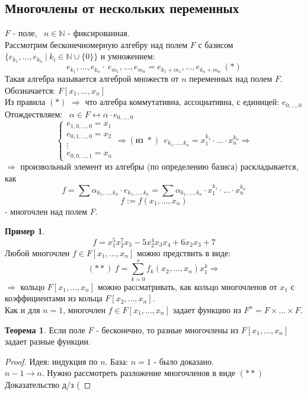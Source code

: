 \documentclass[a4paper, 12pt]{article}
\newcommand{\N}{\mathbb N}
\theoremstyle{definition}
\newtheorem*{theorem}{Теорема}
\newtheorem*{example1}{Пример}
\begin{document}
  \subsection{Многочлены от нескольких переменных}
  $F$ - поле, \ $n \in \N$ - фиксированная. \\
  Рассмотрим бесконечномерную алгебру над полем $F$ с базисом \\ $\{e_{k_1},...,e_{k_n} \ | \ k_i \in \N \cup \{0\} \} $ и умножением:
  $$e_{k_1},...,e_{k_n} \cdot \ e_{m_1},...,e_{m_n} = e_{k_1 + m_1},...,e_{k_n + m_n} \ (*)$$
  Такая алгебра называется алгеброй множеств от $n$ переменных над полем $F$. \\
  Обозначается: $F[x_1,...,x_n]$\\
  Из правила $(*)$ $\Longrightarrow $ что алгебра коммутативна, ассоциативна, с единицей: $e_{0,...,0}$\\
  Отождествляем: \ $\alpha \in F \longleftrightarrow \alpha \cdot e_{0,...,0}$
  $$\begin{cases}
    e_{1,0,...,0} = x_1\\
    e_{0,1,...,0} = x_2\\
    \vdots\\
    e_{0,0,...,1} = x_n
  \end{cases} \Longrightarrow (\text{из } *) \ \ e_{k_1,...,k_n} = x_1^{k_1} \cdot ... \cdot x_n^{k_n} \Longrightarrow $$ 
  $\Longrightarrow $ произвольный элемент из алгебры (по определению базиса) раскладывается, как $$f = \sum \alpha_{k_1,...,k_n} \cdot e_{k_1,...,k_n} = \sum \alpha_{k_1,...,k_n} \cdot x_1^{k_1} \cdot ... \cdot x_n^{k_n}$$
  $$ f:= f(x_1,...,x_n)$$ 
  - многочлен над полем $F$.
  \begin{example1}
    $$f = x_1^5 x_2^7 x_3 - 5x_2^4x_3x_4 + 6x_2x_3 + 7$$
    Любой многочлен $f \in F[x_1,...,x_n]$ можно предствить в виде:
    $$(**) \ f = \sum \limits_{k=0}^sf_k(x_2,...,x_n)x_1^k \Longrightarrow $$
    $\Longrightarrow$ кольцо $F[x_1,...,x_n]$ можно рассматривать, как кольцо многочленов от $x_1$ с коэффициентами из кольца $F[x_2,...,x_n]$.\\
    Как и для $n=1$, многочлен $f \in F[x_1,...,x_n]$ задает функцию из $F^n = F \times ... \times F$.      
  \end{example1} 
  \begin{theorem}
    Если поле $F$ - бесконечно, то разные многочлены из $F[x_1,...,x_n]$ задает разные функции.
  \end{theorem}
  \begin{proof}
    Идея: индукция по $n$. База: $n=1$ - было доказано.\\
    $n-1 \to n$. Нужно рассмотреть разложение многочленов в виде $(**)$\\
    Доказательство д/з (   
  \end{proof}
\end{document}
